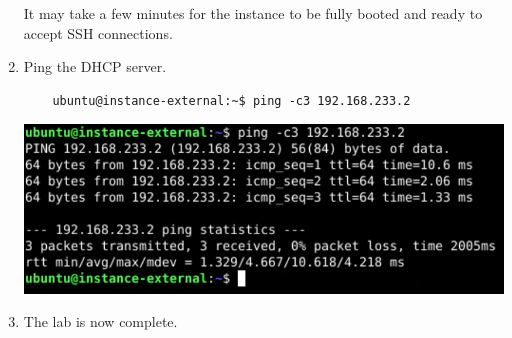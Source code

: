 \documentclass[letterpaper, 12pt]{article}
\begin{document}
\begin{enumerate}
    \begin{notebox}
        It may take a few minutes for the instance to be fully booted and ready to accept SSH connections.
    \end{notebox}

    \item Ping the DHCP server.
    \begin{lstlisting}
    ubuntu@instance-external:~$ ping -c3 192.168.233.2
    \end{lstlisting}

    \begin{center}
        \includegraphics[width=\linewidth]{images/part6/step6.png}
    \end{center}

    \item The lab is now complete.

\end{enumerate}
\end{document}
